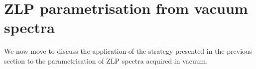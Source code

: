 \section{ZLP parametrisation from vacuum spectra}
\label{sec:results_vacuum}

We now move to discuss the application of the strategy presented in the previous
section to the parametrisation of ZLP spectra acquired in vacuum.

